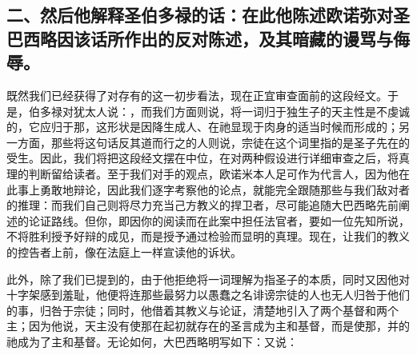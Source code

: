 
\subsection{二、然后他解释圣伯多禄的话：在此他陈述欧诺弥对圣巴西略因该话所作出的反对陈述，及其暗藏的谩骂与侮辱。}

既然我们已经获得了对存有的这一初步看法，现在正宜审查面前的这段经文。于是，伯多禄对犹太人说：，而我们方面则说，将一词归于独生子的天主性是不虔诚的，它应归于那，这形状是因降生成人、在祂显现于肉身的适当时候而形成的；另一方面，那些将这句话反其道而行之的人则说，宗徒在这个词里指的是圣子先在的受生。因此，我们将把这段经文摆在中位，在对两种假设进行详细审查之后，将真理的判断留给读者。至于我们对手的观点，欧诺米本人足可作为代言人，因为他在此事上勇敢地辩论，因此我们逐字考察他的论点，就能完全跟随那些与我们敌对者的推理：而我们自己则将尽力充当己方教义的捍卫者，尽可能追随大巴西略先前阐述的论证路线。但你，即因你的阅读而在此案中担任法官者，要如一位先知所说，不将胜利授予好辩的成见，而是授予通过检验而显明的真理。现在，让我们的教义的控告者上前，像在法庭上一样宣读他的诉状。\par

此外，除了我们已提到的，由于他拒绝将一词理解为指圣子的本质，同时又因他对十字架感到羞耻，他便将连那些最努力以愚蠢之名诽谤宗徒的人也无人归咎于他们的事，归咎于宗徒；同时，他借着其教义与论证，清楚地引入了两个基督和两个主；因为他说，天主没有使那在起初就存在的圣言成为主和基督，而是使那，并的祂成为了主和基督。无论如何，大巴西略明写如下：又说：\par

